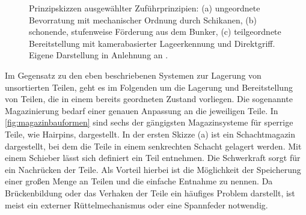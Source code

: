 \begin{figure}[htbp]
\caption[Prinzipskizzen ausgewählter Zuführprinzipien]{Prinzipskizzen ausgewählter
Zuführprinzipien: (a) ungeordnete Bevorratung mit mechanischer Ordnung durch
Schikanen, (b) schonende, stufenweise Förderung aus dem Bunker, (c) teilgeordnete
Bereitstellung mit kamerabasierter Lageerkennung und Direktgriff. Eigene
Darstellung in Anlehnung an .}
\label{fig:zufuehrprinzipien}
\end{figure}
%
Im Gegensatz zu den eben beschriebenen Systemen zur Lagerung von unsortierten Teilen, geht es im Folgenden um die Lagerung und Bereitstellung
von Teilen, die in einem bereits geordneten Zustand vorliegen. Die sogenannte Magazinierung bedarf einer genauen Anpassung
an die jeweiligen Teile. In \cref{fig:magazinbauformen} sind sechs der gängigsten
Magazinsysteme für sperrige Teile, wie Hairpins, dargestellt. In der ersten Skizze (a) ist ein Schachtmagazin dargestellt,
bei dem die Teile in einem senkrechten Schacht gelagert werden. Mit einem Schieber lässt sich definiert ein Teil entnehmen.
Die Schwerkraft sorgt für ein Nachrücken der Teile. Als Vorteil hierbei ist die Möglichkeit der Speicherung
einer großen Menge an Teilen und die einfache Entnahme zu nennen. Da Brückenbildung oder das Verhaken der Teile ein häufiges
Problem darstellt, ist meist ein externer Rüttelmechanismus oder eine Spannfeder notwendig.

